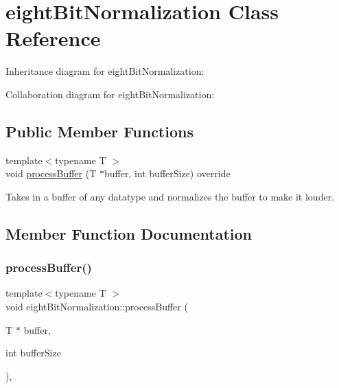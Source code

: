 \hypertarget{classeightBitNormalization}{}\section{eight\+Bit\+Normalization Class Reference}
\label{classeightBitNormalization}


Inheritance diagram for eight\+Bit\+Normalization\+:


Collaboration diagram for eight\+Bit\+Normalization\+:
\subsection*{Public Member Functions}
\begin{DoxyCompactItemize}
\item 
{\footnotesize template$<$typename T $>$ }\\void \hyperlink{classeightBitNormalization_a206e0a9e9da56b79cffd50917ef26449}{process\+Buffer} (T $\ast$buffer, int buffer\+Size) override
\begin{DoxyCompactList}\small\item\em 
\begin{DoxyItemize}
\item Takes in a buffer of any datatype and normalizes the buffer to make it louder. 
\end{DoxyItemize}\end{DoxyCompactList}\end{DoxyCompactItemize}


\subsection{Member Function Documentation}
\mbox{\label{classeightBitNormalization_a206e0a9e9da56b79cffd50917ef26449}} 
\subsubsection{\texorpdfstring{process\+Buffer()}{processBuffer()}}
{\footnotesize\ttfamily template$<$typename T $>$ \\
void eight\+Bit\+Normalization\+::process\+Buffer (\begin{DoxyParamCaption}\item[{T $\ast$}]{buffer,  }\item[{int}]{buffer\+Size }\end{DoxyParamCaption})\hspace{0.3cm}{\ttfamily [inline]}, {\ttfamily [override]}}




